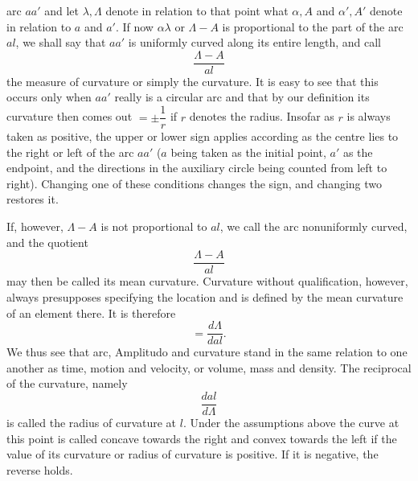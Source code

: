 %
arc $aa'$ and let $\lambda,\Lambda$ denote in relation to that point what $\alpha,A$ and $\alpha',A'$ denote in relation to $a$ and $a'$. If now $\alpha\lambda$ or $\Lambda-A$ is proportional to the part of the arc $al$, we shall say that $aa'$ is uniformly curved along its entire length, and call
\[
\frac{\Lambda-A}{al}
\]
the measure of curvature or simply the curvature. It is easy to see that this occurs only when $aa'$ really is a circular arc and that by our definition its curvature then comes out $=\pm\dfrac1r$ if $r$ denotes the radius. Insofar as $r$ is always taken as positive, the upper or lower sign applies according as the centre lies to the right or left of the arc $aa'$ ($a$ being taken as the initial point, $a'$ as the endpoint, and the directions in the auxiliary circle being counted from left to right). Changing one of these conditions changes the sign, and changing two restores it.

If, however, $\Lambda-A$ is not proportional to $al$, we call the arc nonuniformly curved, and the quotient
\[
\frac{\Lambda-A}{al}
\]
may then be called its mean curvature. Curvature without qualification, however, always presupposes specifying the location and is defined by the mean curvature of an element there. It is therefore
\[
=\frac{d\Lambda}{dal}.
\]
We thus see that arc, Amplitudo and curvature stand in the same relation to one another as time, motion and velocity, or volume, mass and density. The reciprocal of the curvature, namely
\[
\frac{dal}{d\Lambda}
\]
is called the radius of curvature at $l$. Under the assumptions above the curve at this point is called concave towards the right and convex towards the left if the value of its curvature or radius of curvature is positive. If it is negative, the reverse holds.
